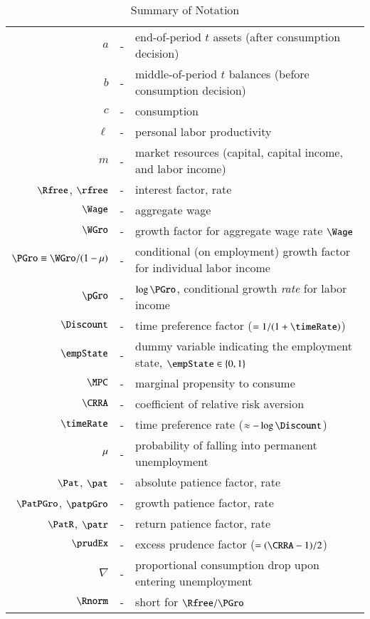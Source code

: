 
\begin{table}
\caption{Summary of Notation}
\label{table:notation}
\medskip\medskip
\begin{tabular}{rcl}
    $a$                            & - & end-of-period $t$ assets (after consumption decision)
\\  $b$                            & - & middle-of-period $t$ balances (before consumption decision)
\\  $c$                            & - & consumption
\\  $\ell$                         & - & personal labor productivity 
\\  $m$                            & - & market resources (capital, capital income, and labor income)
\\  $\Rfree$, $\rfree$             & - & interest factor, rate 
\\  $\Wage$                        & - & aggregate wage
\\  $\WGro$                        & - & growth factor for aggregate wage rate $\Wage$
\\  $\PGro\equiv\WGro/(1-\urate)$  & - & conditional (on employment) growth factor for individual labor income
\\  $\pGro$                        & - & $\log \PGro$, conditional growth {\it rate} for labor income
\\  $\Discount$                    & - & time preference factor ($=1/(1+\timeRate)$)
\\  $\empState$                    & - & dummy variable indicating the employment state, $\empState\in\{0,1\}$
\\  $\MPC$                         & - & marginal propensity to consume
\\  $\CRRA$                        & - & coefficient of relative risk aversion
\\  $\timeRate$                    & - & time preference rate ($\approx - \log \Discount$)
\\  $\mu$                       & - & probability of falling into permanent unemployment 
\\  $\Pat$, $\pat$                 & - & absolute patience factor, rate
\\  $\PatPGro$, $\patpGro$               & - & growth patience factor, rate
\\  $\PatR$, $\patr$               & - & return patience factor, rate
\\  $\prudEx$                      & - & excess prudence factor ($=(\CRRA-1)/2$)
\\  $\nabla$                       & - & proportional consumption drop upon entering unemployment
\\  $\Rnorm$                       & - & short for  $\Rfree/\PGro$
\end{tabular}
\end{table}
